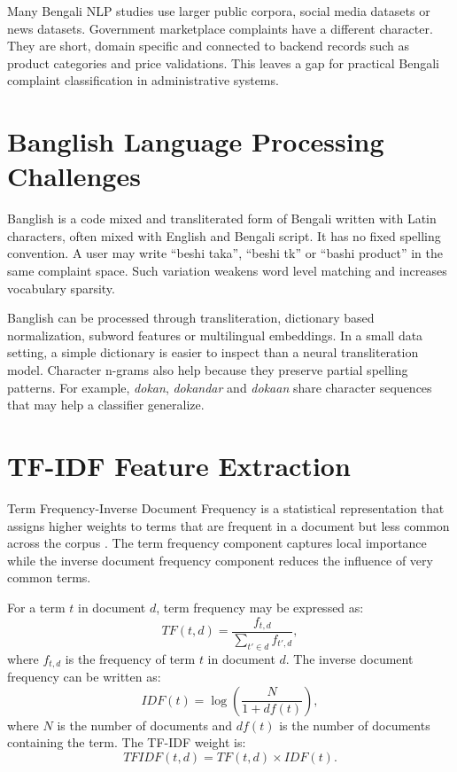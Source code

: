 \documentclass[12pt,a4paper,openany]{book}
\begin{document}
Many Bengali NLP studies use larger public corpora, social media datasets or news datasets. Government marketplace complaints have a different character. They are short, domain specific and connected to backend records such as product categories and price validations. This leaves a gap for practical Bengali complaint classification in administrative systems.

\section{Banglish Language Processing Challenges}
Banglish is a code mixed and transliterated form of Bengali written with Latin characters, often mixed with English and Bengali script. It has no fixed spelling convention. A user may write ``beshi taka'', ``beshi tk'' or ``bashi product'' in the same complaint space. Such variation weakens word level matching and increases vocabulary sparsity.

Banglish can be processed through transliteration, dictionary based normalization, subword features or multilingual embeddings. In a small data setting, a simple dictionary is easier to inspect than a neural transliteration model. Character n-grams also help because they preserve partial spelling patterns. For example, \textit{dokan}, \textit{dokandar} and \textit{dokaan} share character sequences that may help a classifier generalize.

\section{TF-IDF Feature Extraction}
Term Frequency-Inverse Document Frequency is a statistical representation that assigns higher weights to terms that are frequent in a document but less common across the corpus \cite{salton1988term}. The term frequency component captures local importance while the inverse document frequency component reduces the influence of very common terms.

For a term $t$ in document $d$, term frequency may be expressed as:
\begin{equation}
TF(t,d)=\frac{f_{t,d}}{\sum_{t' \in d} f_{t',d}},
\end{equation}
where $f_{t,d}$ is the frequency of term $t$ in document $d$. The inverse document frequency can be written as:
\begin{equation}
IDF(t)=\log\left(\frac{N}{1+df(t)}\right),
\end{equation}
where $N$ is the number of documents and $df(t)$ is the number of documents containing the term. The TF-IDF weight is:
\begin{equation}
TFIDF(t,d)=TF(t,d)\times IDF(t).
\end{equation}
\end{document}
